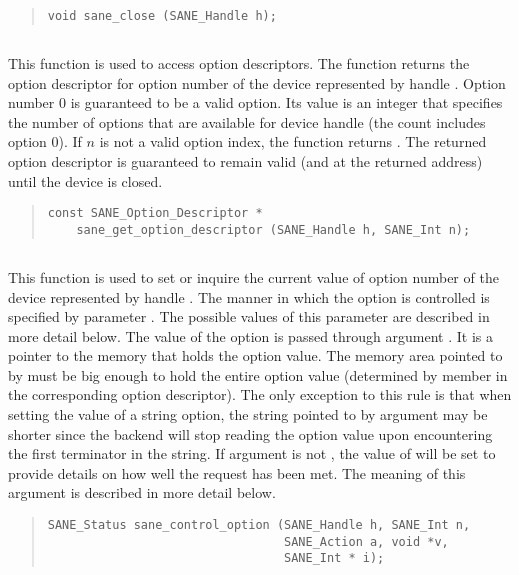 \documentclass[11pt,DVIps]{report}
\begin{document}
\begin{quote}
\begin{verbatim}
void sane_close (SANE_Handle h);
\end{verbatim}
\end{quote}

\subsection{}

This function is used to access option descriptors.  The function
returns the option descriptor for option number  of the device
represented by handle .  Option number 0 is guaranteed to be a
valid option.  Its value is an integer that specifies the number of
options that are available for device handle  (the count
includes option 0).  If $n$ is not a valid option index, the function
returns .  The returned option descriptor is guaranteed to
remain valid (and at the returned address) until the device is closed.

\begin{quote}
\begin{verbatim}
const SANE_Option_Descriptor *
    sane_get_option_descriptor (SANE_Handle h, SANE_Int n);
\end{verbatim}
\end{quote}

\subsection{}\label{sec:control}

This function is used to set or inquire the current value of option
number  of the device represented by handle .  The
manner in which the option is controlled is specified by parameter
.  The possible values of this parameter are described in more
detail below.  The value of the option is passed through argument
.  It is a pointer to the memory that holds the option value.
The memory area pointed to by  must be big enough to hold the
entire option value (determined by member  in the
corresponding option descriptor).  The only exception to this rule is
that when setting the value of a string option, the string pointed to
by argument  may be shorter since the backend will stop
reading the option value upon encountering the first 
terminator in the string.  If argument  is not ,
the value of  will be set to provide details on how well the
request has been met.  The meaning of this argument is described in
more detail below.
\begin{quote}
\begin{verbatim}
SANE_Status sane_control_option (SANE_Handle h, SANE_Int n,
                                 SANE_Action a, void *v,
                                 SANE_Int * i);
\end{verbatim}
\end{quote}
\end{document}

